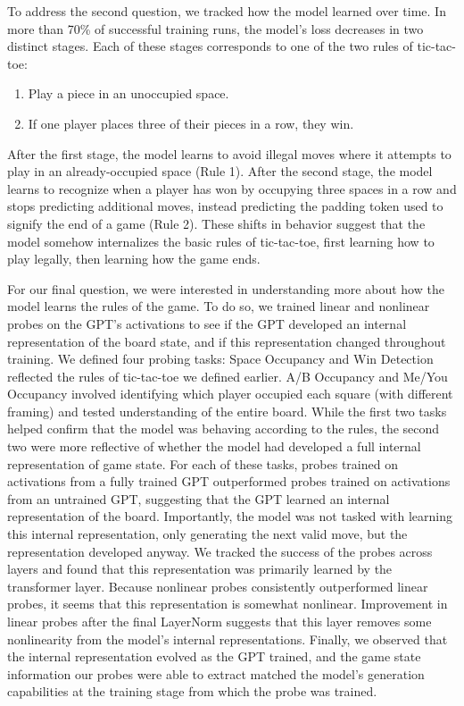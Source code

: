 \documentclass[11pt]{article}
\providecommand{\tightlist}{%
      \setlength{\itemsep}{0pt}\setlength{\parskip}{0pt}}
\begin{document}
To address the second question, we tracked how the model learned over
time. In more than 70\% of successful training runs, the model's loss
decreases in two distinct stages. Each of these stages corresponds to
one of the two rules of tic-tac-toe:

\begin{enumerate}
\def\labelenumi{\arabic{enumi}.}
\tightlist
\item
  Play a piece in an unoccupied space.
\item
  If one player places three of their pieces in a row, they win.
\end{enumerate}

After the first stage, the model learns to avoid illegal moves where it
attempts to play in an already-occupied space (Rule 1). After the second
stage, the model learns to recognize when a player has won by
occupying three spaces in a row and stops predicting additional moves,
instead predicting the padding token used to signify the end of a game
(Rule 2). These shifts in behavior suggest that the model somehow
internalizes the basic rules of tic-tac-toe, first learning how to play
legally, then learning how the game ends.

For our final question, we were interested in understanding more about
how the model learns the rules of the game. To do so, we trained linear
and nonlinear probes on the GPT's activations to see if the GPT
developed an internal representation of the board state, and if this
representation changed throughout training. We defined four probing
tasks: Space Occupancy and Win Detection reflected the rules of
tic-tac-toe we defined earlier. A/B Occupancy and Me/You Occupancy
involved identifying which player occupied each square (with different
framing) and tested understanding of the entire board. While the first
two tasks helped confirm that the model was behaving according to the
rules, the second two were more reflective of whether the model had
developed a full internal representation of game state. For each of
these tasks, probes trained on activations from a fully trained GPT
outperformed probes trained on activations from an untrained GPT,
suggesting that the GPT learned an internal representation of the board.
Importantly, the model was not tasked with learning this internal
representation, only generating the next valid move, but the
representation developed anyway. We tracked the success of the probes
across layers and found that this representation was primarily learned
by the transformer layer. Because nonlinear probes consistently
outperformed linear probes, it seems that this representation is
somewhat nonlinear. Improvement in linear probes after the final
LayerNorm suggests that this layer removes some nonlinearity from the
model's internal representations. Finally, we observed that the internal
representation evolved as the GPT trained, and the game state
information our probes were able to extract matched the model's
generation capabilities at the training stage from which the probe was
trained.
\end{document}
